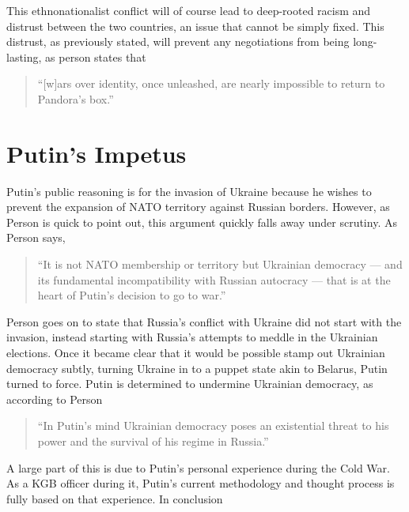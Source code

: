 \documentclass{article}
\begin{document}
        This ethnonationalist conflict will of course lead to deep-rooted racism and distrust between the two countries, an issue that cannot be simply fixed. This distrust, as previously stated, will prevent any negotiations from being long-lasting, as person states that

        \begin{quote}
            ``[w]ars over identity, once unleashed, are nearly impossible to return to Pandora’s box.''
        \end{quote}

\section{Putin's Impetus}

    Putin's public reasoning is for the invasion of Ukraine because he wishes to prevent the expansion of NATO territory against Russian borders. However, as Person is quick to point out, this argument quickly falls away under scrutiny. As Person says,

    \begin{quote}
        ``It is not NATO membership or territory but Ukrainian democracy — and its fundamental incompatibility with Russian autocracy — that is at the heart of Putin's decision to go to war.'' \parencite{person_2025}
    \end{quote}

    Person goes on to state that Russia's conflict with Ukraine did not start with the invasion, instead starting with Russia's attempts to meddle in the Ukrainian elections. Once it became clear that it would be possible stamp out Ukrainian democracy subtly, turning Ukraine in to a puppet state akin to Belarus, Putin turned to force. Putin is determined to undermine Ukrainian democracy, as according to Person

    \begin{quote}
        ``In Putin's mind Ukrainian democracy poses an existential threat to his power and the survival of his regime in Russia.'' \parencite{person_2025}
    \end{quote}

    A large part of this is due to Putin's personal experience during the Cold War. As a KGB officer during it, Putin's current methodology and thought process is fully based on that experience. In conclusion 
\end{document}

